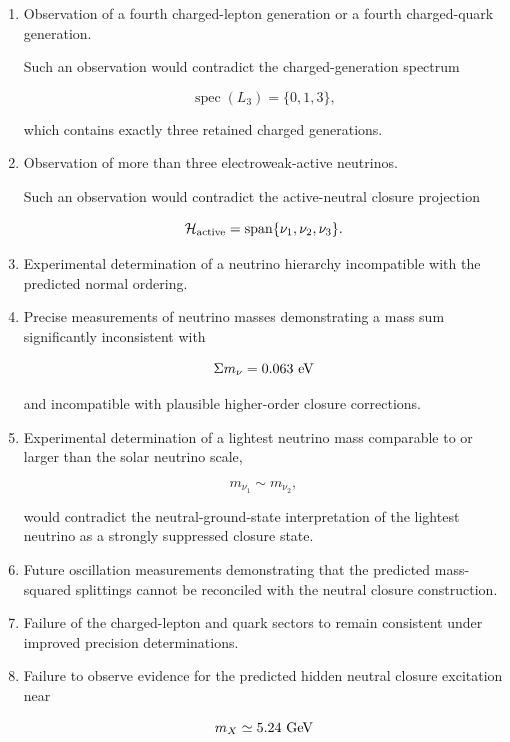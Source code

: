 \documentclass[11pt]{article}
\theoremstyle{definition}
\theoremstyle{remark}
\begin{document}
\begin{enumerate}

\item Observation of a fourth charged-lepton generation or a
fourth charged-quark generation.

Such an observation would contradict the charged-generation
spectrum

\[
\operatorname{spec}(L_3)
=
\{0,1,3\},
\]

which contains exactly three retained charged generations.

\item Observation of more than three electroweak-active
neutrinos.

Such an observation would contradict the active-neutral closure
projection

\[
\mathcal H_{\rm active}
=
\operatorname{span}
\{\nu_1,\nu_2,\nu_3\}.
\]

\item Experimental determination of a neutrino hierarchy
incompatible with the predicted normal ordering.

\item Precise measurements of neutrino masses demonstrating a
mass sum significantly inconsistent with

\[
\Sigma m_\nu
=
0.063~{\rm eV}
\]

and incompatible with plausible higher-order closure
corrections.

\item Experimental determination of a lightest neutrino mass
comparable to or larger than the solar neutrino scale,

\[
m_{\nu_1}
\sim
m_{\nu_2},
\]

would contradict the neutral-ground-state interpretation of the
lightest neutrino as a strongly suppressed closure state.

\item Future oscillation measurements demonstrating that the
predicted mass-squared splittings cannot be reconciled with the
neutral closure construction.

\item Failure of the charged-lepton and quark sectors to remain
consistent under improved precision determinations.

\item Failure to observe evidence for the predicted hidden
neutral closure excitation near

\[
m_X \simeq 5.24~{\rm GeV}
\]


\end{enumerate}
\end{document}
